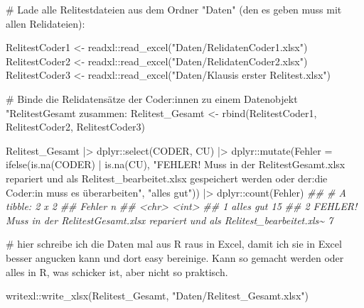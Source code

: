 \documentclass[twoside, pagesize, fontsize=11pt, dvipsnames]{scrreport}
\newenvironment{Shaded}{\begin{snugshade}}{\end{snugshade}}
\newcommand{\AttributeTok}[1]{\textcolor[rgb]{0.40,0.45,0.13}{#1}}
\newcommand{\CommentTok}[1]{\textcolor[rgb]{0.37,0.37,0.37}{#1}}
\newcommand{\DocumentationTok}[1]{\textcolor[rgb]{0.37,0.37,0.37}{\textit{#1}}}
\newcommand{\FunctionTok}[1]{\textcolor[rgb]{0.28,0.35,0.67}{#1}}
\newcommand{\NormalTok}[1]{\textcolor[rgb]{0.00,0.23,0.31}{#1}}
\newcommand{\OtherTok}[1]{\textcolor[rgb]{0.00,0.23,0.31}{#1}}
\newcommand{\SpecialCharTok}[1]{\textcolor[rgb]{0.37,0.37,0.37}{#1}}
\newcommand{\StringTok}[1]{\textcolor[rgb]{0.13,0.47,0.30}{#1}}
\begin{document}
\begin{Shaded}
\begin{Highlighting}[]
\CommentTok{\# Lade alle Relitestdateien aus dem Ordner "Daten" (den es geben muss mit allen Relidateien):}

\NormalTok{RelitestCoder1 }\OtherTok{\textless{}{-}}\NormalTok{ readxl}\SpecialCharTok{::}\FunctionTok{read\_excel}\NormalTok{(}\StringTok{"Daten/RelidatenCoder1.xlsx"}\NormalTok{)}
\NormalTok{RelitestCoder2 }\OtherTok{\textless{}{-}}\NormalTok{ readxl}\SpecialCharTok{::}\FunctionTok{read\_excel}\NormalTok{(}\StringTok{"Daten/RelidatenCoder2.xlsx"}\NormalTok{)}
\NormalTok{RelitestCoder3 }\OtherTok{\textless{}{-}}\NormalTok{ readxl}\SpecialCharTok{::}\FunctionTok{read\_excel}\NormalTok{(}\StringTok{"Daten/Klausis erster Relitest.xlsx"}\NormalTok{)}

\CommentTok{\# Binde die Relidatensätze der Coder:innen zu einem Datenobjekt "RelitestGesamt zusammen:}
\NormalTok{Relitest\_Gesamt }\OtherTok{\textless{}{-}} \FunctionTok{rbind}\NormalTok{(RelitestCoder1, RelitestCoder2, RelitestCoder3) }

\NormalTok{Relitest\_Gesamt }\SpecialCharTok{|\textgreater{}} 
\NormalTok{  dplyr}\SpecialCharTok{::}\FunctionTok{select}\NormalTok{(CODER, CU) }\SpecialCharTok{|\textgreater{}} 
\NormalTok{  dplyr}\SpecialCharTok{::}\FunctionTok{mutate}\NormalTok{(}\AttributeTok{Fehler =} \FunctionTok{ifelse}\NormalTok{(}\FunctionTok{is.na}\NormalTok{(CODER) }\SpecialCharTok{|} \FunctionTok{is.na}\NormalTok{(CU), }\StringTok{"FEHLER! Muss in der RelitestGesamt.xlsx repariert und als Relitest\_bearbeitet.xlsx gespeichert werden oder der:die Coder:in muss es überarbeiten"}\NormalTok{, }\StringTok{"alles gut"}\NormalTok{)) }\SpecialCharTok{|\textgreater{}} 
\NormalTok{  dplyr}\SpecialCharTok{::}\FunctionTok{count}\NormalTok{(Fehler)}
\DocumentationTok{\#\# \# A tibble: 2 x 2}
\DocumentationTok{\#\#   Fehler                                                                                 n}
\DocumentationTok{\#\#   \textless{}chr\textgreater{}                                                                              \textless{}int\textgreater{}}
\DocumentationTok{\#\# 1 alles gut                                                                             15}
\DocumentationTok{\#\# 2 FEHLER! Muss in der RelitestGesamt.xlsx repariert und als Relitest\_bearbeitet.xls\textasciitilde{}     7}

\CommentTok{\# hier schreibe ich die Daten mal aus R raus in Excel, damit ich sie in Excel besser angucken kann und dort easy bereinige. Kann so gemacht werden oder alles in R, was schicker ist, aber nicht so praktisch.}

\NormalTok{writexl}\SpecialCharTok{::}\FunctionTok{write\_xlsx}\NormalTok{(Relitest\_Gesamt, }\StringTok{"Daten/Relitest\_Gesamt.xlsx"}\NormalTok{)}
\end{Highlighting}
\end{Shaded}
\end{document}
